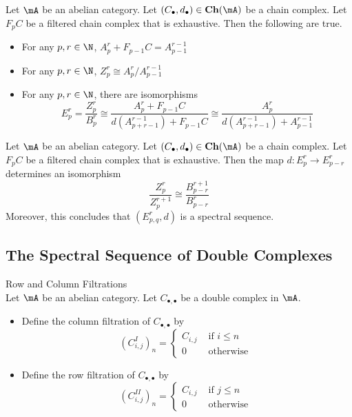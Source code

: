 \documentclass[a4paper]{article}
\begin{document}
\begin{lmm}{}{} Let $\mA$ be an abelian category. Let $(C_\bullet,d_\bullet)\in\bold{Ch}(\mA)$ be a chain complex. Let $F_pC$ be a filtered chain complex that is exhaustive. Then the following are true. 
\begin{itemize}
\item For any $p,r\in\N$, $A_p^r+F_{p-1}C=A_{p-1}^{r-1}$
\item For any $p,r\in\N$, $Z_p^r\cong A_p^r/A_{p-1}^{r-1}$
\item For any $p,r\in\N$, there are isomorphisms $$E_p^r=\frac{Z_p^r}{B_p^r}\cong\frac{A_p^r+F_{p-1}C}{d(A_{p+r-1}^{r-1})+F_{p-1}C}\cong\frac{A_p^r}{d(A_{p+r-1}^{r-1})+A_{p-1}^{r-1}}$$
\end{itemize}
\end{lmm}

\begin{thm}{}{} Let $\mA$ be an abelian category. Let $(C_\bullet,d_\bullet)\in\bold{Ch}(\mA)$ be a chain complex. Let $F_pC$ be a filtered chain complex that is exhaustive. Then the map $d:E_p^r\to E_{p-r}^r$ determines an isomorphism $$\frac{Z_p^r}{Z_p^{r+1}}\cong\frac{B_{p-r}^{r+1}}{B_{p-r}^r}$$ Moreover, this concludes that $(E_{p,q}^r,d)$ is a spectral sequence. 
\end{thm}

\subsection{The Spectral Sequence of Double Complexes}
\begin{defn}{Row and Column Filtrations}{}\\
Let $\mA$ be an abelian category. Let $C_{\bullet,\bullet}$ be a double complex in $\mA$. 
\begin{itemize}
\item Define the column filtration of $C_{\bullet,\bullet}$ by $$(C_{i,j}^I)_n=\begin{cases}
C_{i,j} & \text{ if } i\leq n\\
0 & \text{ otherwise }
\end{cases}$$
\item Define the row filtration of $C_{\bullet,\bullet}$ by $$(C_{i,j}^{II})_n=\begin{cases}
C_{i,j} & \text{ if } j\leq n\\
0 & \text{ otherwise }
\end{cases}$$
\end{itemize}
\end{defn}
\end{document}
